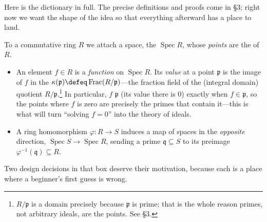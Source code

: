 \documentclass[11pt]{article}
\DeclareMathOperator{\Spec}{Spec}
\DeclareMathOperator{\Frac}{Frac}
\newcommand{\mfp}{\mathfrak{p}}
\newcommand{\mfq}{\mathfrak{q}}
\begin{document}
Here is the dictionary in full. The precise definitions and proofs come in \S3; right now we
want the shape of the idea so that everything afterward has a place to land.

\begin{ppreview}
To a commutative ring $R$ we attach a space, the  $\Spec R$, whose
\emph{points} are the  of $R$.
\begin{itemize}\setlength{\itemsep}{2pt}
\item An element $f\in R$ is a \emph{function} on $\Spec R$. Its \emph{value} at a point
$\mfp$ is the image of $f$ in the 
$\kappa(\mfp)\defeq \Frac(R/\mfp)$---the fraction field of the (integral domain) quotient
$R/\mfp$.\footnote{$R/\mfp$ is a domain precisely because $\mfp$ is prime; that is the whole
reason primes, not arbitrary ideals, are the points. See \S3.} In particular, $f$
 $\mfp$ (its value there is $0$) exactly when $f\in\mfp$, so the points
where $f$ is zero are precisely the primes that contain it---this is what will turn
``solving $f=0$'' into the theory of ideals.
\item A ring homomorphism $\varphi\colon R\to S$ induces a map of spaces in the
\emph{opposite} direction, $\Spec S\to\Spec R$, sending a prime $\mfq\subseteq S$ to its
preimage $\varphi^{-1}(\mfq)\subseteq R$.
\end{itemize}
\end{ppreview}

Two design decisions in that box deserve their motivation, because each is a place where a
beginner's first guess is wrong.
\end{document}

